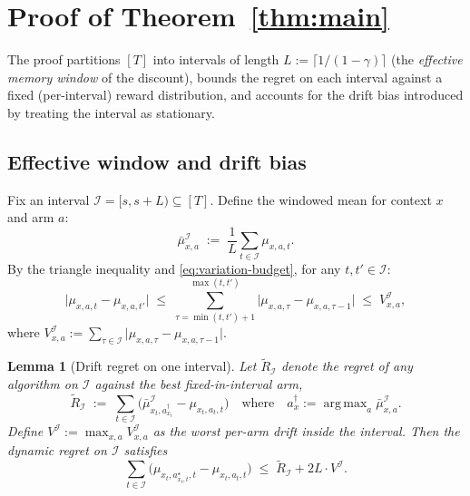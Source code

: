\documentclass[11pt]{article}
\newtheorem{lemma}[theorem]{Lemma}
\theoremstyle{definition}
\DeclareMathOperator*{\argmax}{arg\,max}
\begin{document}
\section{Proof of Theorem~\ref{thm:main}}
\label{sec:proof}

The proof partitions $[T]$ into intervals of length $L := \lceil 1/(1-\gamma) \rceil$ (the \emph{effective memory window} of the discount), bounds the regret on each interval against a fixed (per-interval) reward distribution, and accounts for the drift bias introduced by treating the interval as stationary.

\subsection{Effective window and drift bias}

Fix an interval $\mathcal{I} = [s, s+L) \subseteq [T]$. Define the windowed mean for context $x$ and arm $a$:
\[
    \bar{\mu}_{x,a}^{\mathcal{I}} \;:=\; \frac{1}{L} \sum_{t \in \mathcal{I}} \mu_{x,a,t}.
\]
By the triangle inequality and \eqref{eq:variation-budget}, for any $t, t' \in \mathcal{I}$:
\[
    \big|\mu_{x,a,t} - \mu_{x,a,t'}\big| \;\leq\; \sum_{\tau = \min(t,t')+1}^{\max(t,t')} \big|\mu_{x,a,\tau} - \mu_{x,a,\tau-1}\big| \;\leq\; V^{\mathcal{I}}_{x,a},
\]
where $V^{\mathcal{I}}_{x,a} := \sum_{\tau \in \mathcal{I}}\big|\mu_{x,a,\tau} - \mu_{x,a,\tau-1}\big|$.

\begin{lemma}[Drift regret on one interval]
\label{lem:drift}
Let $\widetilde{R}_{\mathcal{I}}$ denote the regret of any algorithm on $\mathcal{I}$ against the \emph{best fixed-in-interval} arm,
\[
    \widetilde{R}_{\mathcal{I}} \;:=\; \sum_{t \in \mathcal{I}} \Big(\bar{\mu}^{\mathcal{I}}_{x_t, a^\dagger_{x_t}} - \mu_{x_t, a_t, t}\Big)
    \quad \text{where} \quad a^\dagger_{x} := \argmax_a \bar{\mu}^{\mathcal{I}}_{x,a}.
\]
Define $V^{\mathcal{I}} := \max_{x,a} V^{\mathcal{I}}_{x,a}$ as the worst per-arm drift inside the interval. Then the dynamic regret on $\mathcal{I}$ satisfies
\begin{equation}
    \sum_{t \in \mathcal{I}}\Big(\mu_{x_t, a^\star_{x_t, t}, t} - \mu_{x_t, a_t, t}\Big) \;\leq\; \widetilde{R}_{\mathcal{I}} + 2 L \cdot V^{\mathcal{I}}.
    \label{eq:lem-drift}
\end{equation}
\end{lemma}
\end{document}
